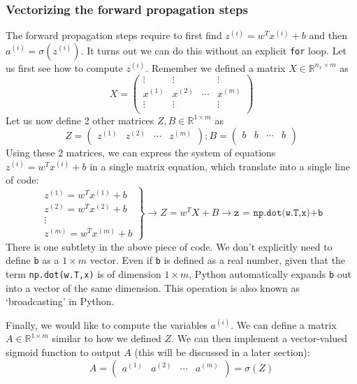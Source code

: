 \documentclass{article}[a4paper,12pt]
\theoremstyle{definition}
\begin{document}
\subsubsection{Vectorizing the forward propagation steps}
The forward propagation steps require to first find $z^{(i)}=w^Tx^{(i)}+b$ and then $a^{(i)}=\sigma(z^{(i)})$. It turns out we can do this without an explicit \texttt{for} loop. Let us first see how to compute $z^{(i)}$. Remember we defined a matrix $X\in\mathbb{R}^{n_x\times m}$ as
$$X=\begin{pmatrix}
	\vdots & \vdots & & \vdots\\
	x^{(1)} & x^{(2)} & \cdots & x^{(m)}\\
	\vdots & \vdots & & \vdots\\
\end{pmatrix}$$
Let us now define 2 other matrices $Z,B\in\mathbb{R}^{1\times m}$ as
$$Z=\begin{pmatrix}
	z^{(1)} & z^{(2)} & \cdots & z^{(m)}\\
\end{pmatrix};
B=\begin{pmatrix}
	b & b & \cdots & b\\
\end{pmatrix}$$
Using these 2 matrices, we can express the system of equations $z^{(i)}=w^Tx^{(i)}+b$ in a single matrix equation, which translate into a single line of code:
$$\left. \begin{array}{cc}
    z^{(1)}=w^Tx^{(1)}+b \\
    z^{(2)}=w^Tx^{(2)}+b \\
    \vdots \\
    z^{(m)}=w^Tx^{(m)}+b
\end{array}{} \right\}
\longrightarrow Z = w^TX+B \longrightarrow \texttt{z = np.dot(w.T,x)+b}
$$
There is one subtlety in the above piece of code. We don't explicitly need to define \texttt{b} as a $1\times m$ vector. Even if \texttt{b} is defined as a real number, given that the term \texttt{np.dot(w.T,x)} is of dimension $1\times m$, Python automatically expands \texttt{b} out into a vector of the same dimension. This operation is also known as `broadcasting' in Python.
\vspace{6pt}

Finally, we would like to compute the variables $a^{(i)}$. We can define a matrix $A\in\mathbb{R}^{1\times m}$ similar to how we defined $Z$. We can then implement a vector-valued sigmoid function to output $A$ (this will be discussed in a later section):
$$A=\begin{pmatrix}
	a^{(1)} & a^{(2)} & \cdots & a^{(m)}\\
\end{pmatrix}=\sigma(Z)$$
\end{document}
